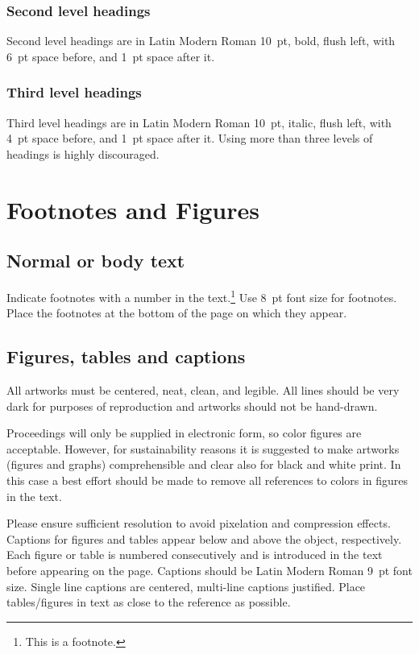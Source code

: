 \documentclass[non-peer-review]{fa2026}
\begin{document}
\subsubsection{Second level headings}
Second level headings are in Latin Modern Roman \SI{10}{pt}, bold, flush left, with \SI{6}{pt} space before, and \SI{1}{pt} space after it.

\subsubsection{Third level headings}

Third level headings are in Latin Modern Roman \SI{10}{pt}, italic, flush left, with \SI{4}{pt} space before, and \SI{1}{pt} space after it. Using more than three levels of headings is highly discouraged.


\section{Footnotes and Figures}

\subsection{Normal or body text}

Indicate footnotes with a number in the text.\footnote{This is a footnote.}
Use \SI{8}{pt} font size for footnotes. Place the footnotes at the bottom of the page on which they appear.

\subsection{Figures, tables and captions}

All artworks must be centered, neat, clean, and legible.
All lines should be very dark for purposes of reproduction and artworks should not be hand-drawn.

Proceedings will only be supplied in electronic form, so color figures are acceptable. However, for sustainability reasons it is suggested to make artworks (figures and graphs) comprehensible and clear also for black and white print. In this case a best effort should be made to remove all references to colors in figures in the text.

Please ensure sufficient resolution to avoid pixelation and compression effects. Captions for figures and tables appear below and above the object, respectively.
Each figure or table is numbered consecutively and is introduced in the text before appearing on the page. Captions should be Latin Modern Roman \SI{9}{pt} font size. Single line captions are centered, multi-line captions justified. Place tables/figures in text as close to the reference as possible.
\end{document}
